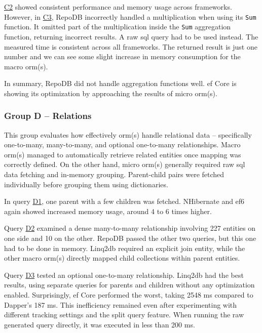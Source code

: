 \hyperref[query:c2]{C2} showed consistent performance and memory usage across frameworks. However, in \hyperref[query:c3]{C3}, RepoDB incorrectly handled a multiplication when using its \texttt{Sum} function. It omitted part of the multiplication inside the \texttt{Sum} aggregation function, returning incorrect results. A raw \acrshort{sql} query had to be used instead. The measured time is consistent across all frameworks. The returned result is just one number and we can see some slight increase in memory consumption for the macro \acrshort{orm}(s).

In summary, RepoDB did not handle aggregation functions well. \acrshort{ef} Core is showing its optimization by approaching the results of micro \acrshort{orm}(s).

\subsubsection{Group D -- Relations}
This group evaluates how effectively \acrshort{orm}(s) handle relational data -- specifically one-to-many, many-to-many, and optional one-to-many relationships. Macro \acrshort{orm}(s) managed to automatically retrieve related entities once mapping was correctly defined. On the other hand, micro \acrshort{orm}(s) generally required raw \acrshort{sql} data fetching and in-memory grouping. Parent-child pairs were fetched individually before grouping them using dictionaries.

In query \hyperref[query:d1]{D1}, one parent with a few children was fetched. NHibernate and \acrshort{ef}6 again showed increased memory usage, around 4 to 6 times higher.

Query \hyperref[query:d2]{D2} examined a dense many-to-many relationship involving 227 entities on one side and 10 on the other. RepoDB passed the other two queries, but this one had to be done in memory. Linq2db required an explicit join entity, while the other macro \acrshort{orm}(s) directly mapped child collections within parent entities.

Query \hyperref[query:d3]{D3} tested an optional one-to-many relationship. Linq2db had the best results, using separate queries for parents and children without any optimization enabled. Surprisingly, \acrshort{ef} Core performed the worst, taking 2548 ms compared to Dapper's 187 ms. This inefficiency remained even after experimenting with different tracking settings and the split query feature. When running the raw generated query directly, it was executed in less than 200 ms.


